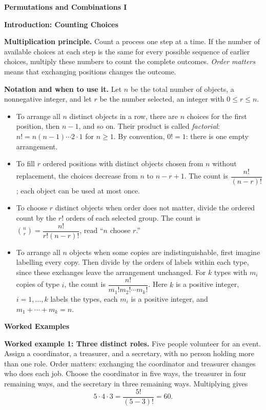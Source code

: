 \documentclass[11pt]{article}
\newcommand{\stageheading}[1]{%
  \par\Needspace{6\baselineskip}%
  \addvspace{.65\baselineskip}%
  {\centering\large\bfseries #1\par}%
  \nopagebreak[4]}
\begin{document}
\vspace*{0pt}
{\centering\Large\bfseries Permutations and Combinations I\par}

\stageheading{Introduction: Counting Choices}

\textbf{Multiplication principle.} Count a process one step at a time.
If the number of available choices at each step is the same for every
possible sequence of earlier choices, multiply these numbers to count
the complete outcomes. \emph{Order matters} means that exchanging
positions changes the outcome.

\textbf{Notation and when to use it.} Let $n$ be the total number of
objects, a nonnegative integer, and let $r$ be the number selected,
an integer with $0\leq r\leq n$.
\begin{itemize}[leftmargin=*,itemsep=3pt,topsep=3pt,parsep=0pt]
\item To arrange all $n$ distinct objects in a row, there are $n$ choices
for the first position, then $n-1$, and so on. Their product is called
\emph{factorial}: $n!=n(n-1)\cdots2\cdot1$ for $n\geq1$.
By convention, $0!=1$: there is one empty arrangement.
\item To fill $r$ ordered positions with distinct objects chosen from $n$
without replacement, the choices decrease from $n$ to $n-r+1$.
The count is $\dfrac{n!}{(n-r)!}$; each object can be used at most once.
\item To choose $r$ distinct objects when order does not matter, divide
the ordered count by the $r!$ orders of each selected group. The count is
$\displaystyle\binom{n}{r}=\dfrac{n!}{r!(n-r)!}$, read ``$n$ choose $r$.''
\item To arrange all $n$ objects when some copies are indistinguishable,
first imagine labelling every copy. Then divide by the orders of labels
within each type, since these exchanges leave the arrangement unchanged.
For $k$ types with $m_i$ copies of type $i$, the count is
$\dfrac{n!}{m_1!m_2!\cdots m_k!}$.
Here $k$ is a positive integer, $i=1,\ldots,k$ labels the types, each
$m_i$ is a positive integer, and $m_1+\cdots+m_k=n$.
\end{itemize}

\clearpage
\stageheading{Worked Examples}

\textbf{Worked example 1: Three distinct roles.}
Five people volunteer for an event. Assign a coordinator, a treasurer,
and a secretary, with no person holding more than one role. Order matters:
exchanging the coordinator and treasurer changes who does each job.
Choose the coordinator in five ways, the treasurer in four remaining
ways, and the secretary in three remaining ways. Multiplying gives
\[
5\cdot4\cdot3=\frac{5!}{(5-3)!}=\boxed{60}.
\]
\end{document}
